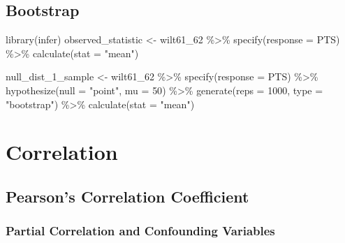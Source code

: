 \documentclass[
  11pt,
]{book}
\newenvironment{Shaded}{\begin{snugshade}}{\end{snugshade}}
\newcommand{\AttributeTok}[1]{\textcolor[rgb]{0.77,0.63,0.00}{#1}}
\newcommand{\DecValTok}[1]{\textcolor[rgb]{0.00,0.00,0.81}{#1}}
\newcommand{\FunctionTok}[1]{\textcolor[rgb]{0.00,0.00,0.00}{#1}}
\newcommand{\NormalTok}[1]{#1}
\newcommand{\OtherTok}[1]{\textcolor[rgb]{0.56,0.35,0.01}{#1}}
\newcommand{\SpecialCharTok}[1]{\textcolor[rgb]{0.00,0.00,0.00}{#1}}
\newcommand{\StringTok}[1]{\textcolor[rgb]{0.31,0.60,0.02}{#1}}
\theoremstyle{definition}
\theoremstyle{definition}
\theoremstyle{definition}
\theoremstyle{definition}
\theoremstyle{remark}
\begin{document}
\hypertarget{bootstrap}{%
\section{Bootstrap}\label{bootstrap}}

\begin{Shaded}
\begin{Highlighting}[]
\FunctionTok{library}\NormalTok{(infer)}
\NormalTok{observed\_statistic }\OtherTok{\textless{}{-}}\NormalTok{ wilt61\_62 }\SpecialCharTok{\%\textgreater{}\%}
  \FunctionTok{specify}\NormalTok{(}\AttributeTok{response =}\NormalTok{ PTS) }\SpecialCharTok{\%\textgreater{}\%}
  \FunctionTok{calculate}\NormalTok{(}\AttributeTok{stat =} \StringTok{"mean"}\NormalTok{)}

\NormalTok{null\_dist\_1\_sample }\OtherTok{\textless{}{-}}\NormalTok{ wilt61\_62 }\SpecialCharTok{\%\textgreater{}\%}
  \FunctionTok{specify}\NormalTok{(}\AttributeTok{response =}\NormalTok{ PTS) }\SpecialCharTok{\%\textgreater{}\%}
  \FunctionTok{hypothesize}\NormalTok{(}\AttributeTok{null =} \StringTok{"point"}\NormalTok{, }\AttributeTok{mu =} \DecValTok{50}\NormalTok{) }\SpecialCharTok{\%\textgreater{}\%}
  \FunctionTok{generate}\NormalTok{(}\AttributeTok{reps =} \DecValTok{1000}\NormalTok{, }\AttributeTok{type =} \StringTok{"bootstrap"}\NormalTok{) }\SpecialCharTok{\%\textgreater{}\%}
  \FunctionTok{calculate}\NormalTok{(}\AttributeTok{stat =} \StringTok{"mean"}\NormalTok{)}
\end{Highlighting}
\end{Shaded}

\hypertarget{correlation}{%
\chapter{Correlation}\label{correlation}}

\hypertarget{pearsons-correlation-coefficient}{%
\section{Pearson's Correlation Coefficient}\label{pearsons-correlation-coefficient}}

\hypertarget{partial-correlation-and-confounding-variables}{%
\subsection{Partial Correlation and Confounding Variables}\label{partial-correlation-and-confounding-variables}}
\end{document}
